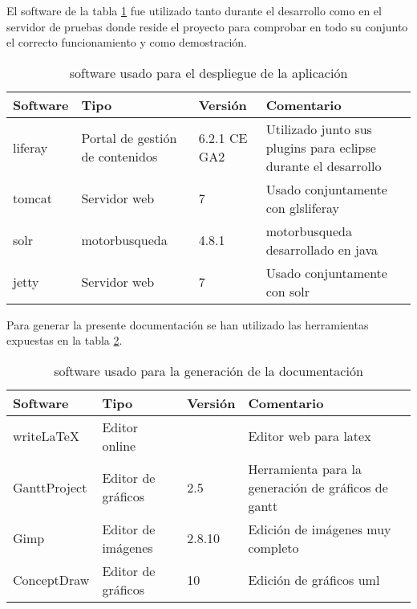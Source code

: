 El \gls{software} de la tabla \ref{table:sofdesp} fue utilizado tanto durante el desarrollo como en el servidor de pruebas donde reside el proyecto para comprobar en todo su conjunto el correcto funcionamiento y como demostración.

\begin{center}
\begin {table}[H]
\centering
    \begin{tabular}{ | p{3cm}  p{4cm}   p{3cm}   p{5cm} |}
    \hline
    \textbf{Software} & \textbf{Tipo} & \textbf{Versión} & \textbf{Comentario} \\ \hline
    \gls{liferay} & Portal de gestión de contenidos & 6.2.1 CE GA2 & Utilizado junto sus \glspl{plugin} para \gls{eclipse} durante el desarrollo \\ \hline
    \gls{tomcat} & Servidor web & 7 &  Usado conjuntamente con gls{liferay} \\
    \hline
    \gls{solr} & \Gls{motorbusqueda}& 4.8.1& \Gls{motorbusqueda} desarrollado en \Gls{java}\\ \hline
    \gls{jetty} & Servidor web & 7& Usado conjuntamente con \gls{solr} \\ \hline
    \end{tabular}
    \caption{\Gls{software} usado para el \gls{despliegue} de la aplicación}
    \label{table:sofdesp}
  \end{table}
\end{center}

Para generar la presente documentación se han utilizado las herramientas expuestas en la tabla \ref{table:softdoc}.

\begin{center}
\begin {table}[H]
\centering
    \begin{tabular}{ | p{3cm}  p{4cm}   p{3cm}   p{5cm} |}
    \hline
    \textbf{Software} & \textbf{Tipo} & \textbf{Versión} & \textbf{Comentario} \\ \hline
    write\LaTeX{} & Editor online &  & Editor web para \gls{latex} \\ \hline
    GanttProject & Editor de gráficos & 2.5& Herramienta para la generación de gráficos de \Gls{gantt} \\ \hline
    Gimp & Editor de imágenes &  2.8.10 & Edición de imágenes muy completo \\ \hline
    ConceptDraw & Editor de gráficos &  10  & Edición de gráficos \gls{uml} \\ \hline
    \end{tabular}
    \caption{\Gls{software} usado para la generación de la documentación}
    \label{table:softdoc}
  \end{table}
\end{center}


